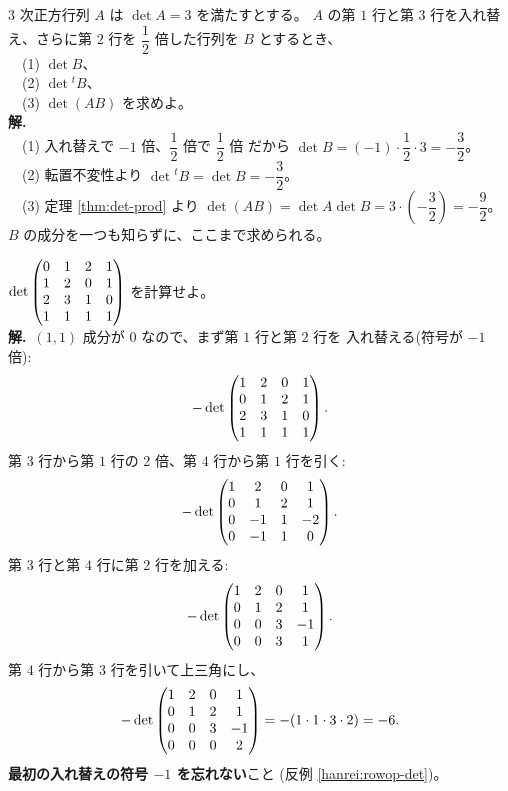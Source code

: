 \begin{rei}[例題・基本(法則の運用)]\label{rei:gendet-rules}
$3$ 次正方行列 $A$ は $\det A = 3$ を満たすとする。
$A$ の第 $1$ 行と第 $3$ 行を入れ替え、さらに第 $2$ 行を
$\dfrac{1}{2}$ 倍した行列を $B$ とするとき、\\
　(1) $\det B$、\\
　(2) $\det {}^t\!B$、\\
　(3) $\det(AB)$ を求めよ。\\
\textbf{解.}\\
　(1) 入れ替えで $-1$ 倍、$\dfrac{1}{2}$ 倍で $\dfrac{1}{2}$ 倍
だから $\det B = (-1) \cdot \dfrac{1}{2} \cdot 3 = -\dfrac{3}{2}$。\\
　(2) 転置不変性より $\det {}^t\!B = \det B = -\dfrac{3}{2}$。\\
　(3) 定理 \ref{thm:det-prod} より
$\det(AB) = \det A \det B = 3 \cdot \left(-\dfrac{3}{2}\right)
= -\dfrac{9}{2}$。
$B$ の成分を一つも知らずに、ここまで求められる。
\end{rei}

\begin{rei}[例題・標準(行交換を含む $4$ 次)]\label{rei:gendet-4x4swap}
$\det \begin{pmatrix}0 & 1 & 2 & 1 \\ 1 & 2 & 0 & 1 \\ 2 & 3 & 1 & 0 \\ 1 & 1 & 1 & 1\end{pmatrix}$
を計算せよ。\\
\textbf{解.}\ $(1,1)$ 成分が $0$ なので、まず第 $1$ 行と第 $2$ 行を
入れ替える(符号が $-1$ 倍):
\[
-\det \begin{pmatrix}1 & 2 & 0 & 1 \\ 0 & 1 & 2 & 1 \\ 2 & 3 & 1 & 0 \\ 1 & 1 & 1 & 1\end{pmatrix}.
\]
第 $3$ 行から第 $1$ 行の $2$ 倍、第 $4$ 行から第 $1$ 行を引く:
\[
-\det \begin{pmatrix}1 & 2 & 0 & 1 \\ 0 & 1 & 2 & 1 \\ 0 & -1 & 1 & -2 \\ 0 & -1 & 1 & 0\end{pmatrix}.
\]
第 $3$ 行と第 $4$ 行に第 $2$ 行を加える:
\[
-\det \begin{pmatrix}1 & 2 & 0 & 1 \\ 0 & 1 & 2 & 1 \\ 0 & 0 & 3 & -1 \\ 0 & 0 & 3 & 1\end{pmatrix}.
\]
第 $4$ 行から第 $3$ 行を引いて上三角にし、
\[
-\det \begin{pmatrix}1 & 2 & 0 & 1 \\ 0 & 1 & 2 & 1 \\ 0 & 0 & 3 & -1 \\ 0 & 0 & 0 & 2\end{pmatrix}
= -(1 \cdot 1 \cdot 3 \cdot 2) = -6.
\]
\textbf{最初の入れ替えの符号 $-1$ を忘れない}こと
(反例 \ref{hanrei:rowop-det})。
\end{rei}

